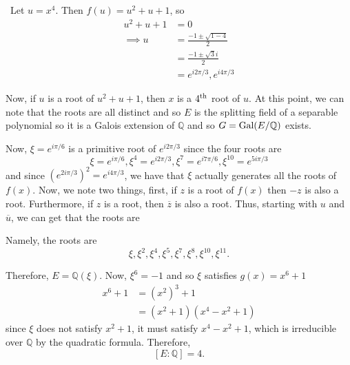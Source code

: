 \documentclass[12pt]{Qual}
\begin{document}
\begin{solution}$\,$
Let $u=x^4$. Then $f(u)=u^2+u+1$, so \begin{align*}
    u^2+u+1&=0\\
    \implies u&=\frac{-1\pm\sqrt{1-4}}{2}\\
    &=\frac{-1\pm\sqrt{3}i}{2}\\
    &=e^{i2\pi/3},e^{i4\pi/3}
\end{align*}

Now, if $u$ is a root of $u^2+u+1$, then $x$ is a $4^\text{th}$ root of $u$. At this point, we can note that the roots are all distinct and so $E$ is the splitting field of a separable polynomial so it is a Galois extension of $\mathbb{Q}$ and so $G=\text{Gal}(E/\mathbb{Q})$ exists.

Now, $\xi=e^{i\pi/6}$ is a primitive root of $e^{i2\pi/3}$ since the four roots are $$\xi=e^{i\pi/6},\xi^4=e^{i2\pi/3},\xi^7=e^{i7\pi/6},\xi^{10}=e^{5i\pi/3}$$ and since $(e^{2i\pi/3})^2=e^{i4\pi/3}$, we have that $\xi$ actually generates all the roots of $f(x)$. Now, we note two things, first, if $z$ is a root of $f(x)$ then $-z$ is also a root. Furthermore, if $z$ is a root, then $\overline{z}$ is also a root. Thus, starting with $u$ and $\overline{u}$, we can get that the roots are
\begin{center}
\end{center}

Namely, the roots are $$\xi,\xi^2,\xi^4,\xi^5,\xi^7,\xi^8,\xi^{10},\xi^{11}.$$

Therefore, $E=\mathbb{Q}(\xi)$. Now, $\xi^6=-1$ and so $\xi$ satisfies $g(x)=x^6+1$ \begin{align*}
    x^6+1&=(x^2)^3+1\\
    &=(x^2+1)(x^4-x^2+1)
\end{align*} since $\xi$ does not satisfy $x^2+1$, it must satisfy $x^4-x^2+1$, which is irreducible over $\mathbb{Q}$ by the quadratic formula.
Therefore, $$[E:\mathbb{Q}]=4.$$


\end{solution}
\end{document}

